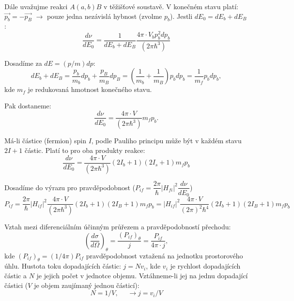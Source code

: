 \documentclass[../../main.tex]{subfiles}
\begin{document}
Dále uvažujme reakci $A(a,b)B$ v těžišťové soustavě. V konečném stavu platí: $\vec{p_b} = - \vec{p_B}$ $\rightarrow$ pouze jedna nezávislá hybnost (zvolme $p_b$). Jestli $dE_0 = dE_b + dE_B$: 
\begin{equation}
\dfrac{d \nu}{dE_0} = \dfrac{1}{dE_b + dE_B} \dfrac{4\pi \cdotp V_b p_{b}^2 dp_b}{(2 \pi \hbar ^3)}
\end{equation}

Dosadíme za $dE = (p/m) dp$:
\begin{equation}
dE_b + dE_B = \dfrac{p_b}{m_b}dp_b + \dfrac{p_B}{m_B}dp_B = \left(\dfrac{1}{m_b} + \dfrac{1}{m_B} \right) p_b dp_b = \dfrac{1}{m_f} p_b dp_b ,
\end{equation}
kde $m_f$ je redukovaná hmotnost konečného stavu.

Pak dostaneme:
\begin{equation}
\dfrac{d \nu}{dE_0} = \dfrac{4\pi \cdotp V}{(2 \pi \hbar ^3)} m_f p_b.
\end{equation}

Má-li částice (fermion) spin $I$, podle Pauliho principu může být v každém stavu $2I + 1$ částic. Platí to pro oba produkty reakce:
\begin{equation}
\dfrac{d \nu}{dE_0} = \dfrac{4\pi \cdotp V}{(2 \pi \hbar ^3)}(2 I_b + 1)(2I_s + 1)m_f p_b
\end{equation}

Dosadíme do výrazu pro pravděpodobnost ($P_{if} = \dfrac{2 \pi}{\hbar} |H_{fi}| ^2 \dfrac{d \nu}{dE_0}$)
\begin{equation}
P_{if} = \dfrac{2 \pi}{\hbar} |H_{if}|^2 \dfrac{4\pi \cdotp V}{(2 \pi \hbar ^3)} (2 I_b + 1)(2 I_B + 1)m_f p_b = |H_{if}|^2 \dfrac{4\pi  \cdotp V}{(2 \pi )^2 \hbar ^4} (2 I_b + 1)(2 I_B + 1)m_f p_b
\end{equation}

Vztah mezi diferenciálním účinným průřezem a pravděpodobností přechodu:
\begin{equation}
\left( \dfrac{d \sigma}{d \Omega}\right)_{\theta} = \dfrac{(P_{if})_{\theta}}{j} = \dfrac{P_{if}}{4 \pi \cdotp j} ,
\end{equation}
kde $(P_{if})_{\theta} = (1/4 \pi)P_{if}$ pravděpodobnost vztažená na jednotku prostorového úhlu. Hustota toku dopadajících částic: $j = N v_i$, kde $v_i$ je rychlost dopadajících částic a $N$ je jejich počet v jednotce objemu. Vztáhneme-li jej na jednu dopadající částici ($V$ je objem zaujímaný jednou částicí):
\begin{equation}
N = 1/V, ~~~~~~ \rightarrow j = v_i /V
\end{equation}
\end{document}
